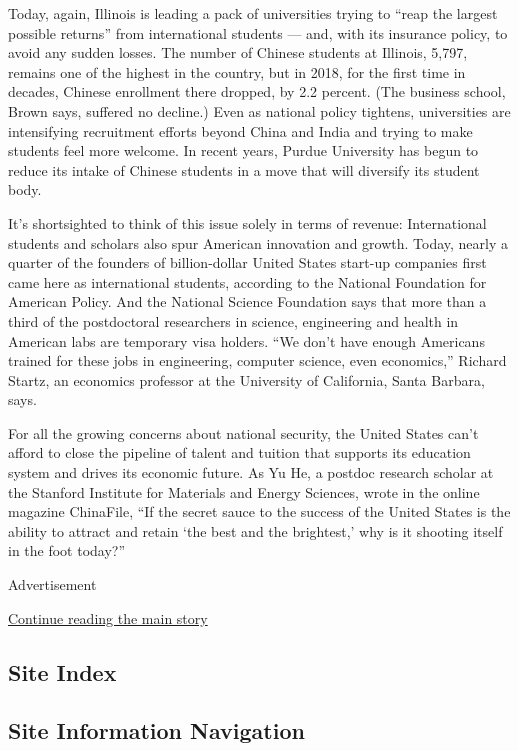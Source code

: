 Today, again, Illinois is leading a pack of universities trying to
``reap the largest possible returns'' from international students ---
and, with its insurance policy, to avoid any sudden losses. The number
of Chinese students at Illinois, 5,797, remains one of the highest in
the country, but in 2018, for the first time in decades, Chinese
enrollment there dropped, by 2.2 percent. (The business school, Brown
says, suffered no decline.) Even as national policy tightens,
universities are intensifying recruitment efforts beyond China and India
and trying to make students feel more welcome. In recent years, Purdue
University has begun to reduce its intake of Chinese students in a move
that will diversify its student body.

It's shortsighted to think of this issue solely in terms of revenue:
International students and scholars also spur American innovation and
growth. Today, nearly a quarter of the founders of billion-dollar United
States start-up companies first came here as international students,
according to the National Foundation for American Policy. And the
National Science Foundation says that more than a third of the
postdoctoral researchers in science, engineering and health in American
labs are temporary visa holders. ``We don't have enough Americans
trained for these jobs in engineering, computer science, even
economics,'' Richard Startz, an economics professor at the University of
California, Santa Barbara, says.

For all the growing concerns about national security, the United States
can't afford to close the pipeline of talent and tuition that supports
its education system and drives its economic future. As Yu He, a postdoc
research scholar at the Stanford Institute for Materials and Energy
Sciences, wrote in the online magazine ChinaFile, ``If the secret sauce
to the success of the United States is the ability to attract and retain
`the best and the brightest,' why is it shooting itself in the foot
today?''

Advertisement

\protect\hyperlink{after-bottom}{Continue reading the main story}

\hypertarget{site-index}{%
\subsection{Site Index}\label{site-index}}

\hypertarget{site-information-navigation}{%
\subsection{Site Information
Navigation}\label{site-information-navigation}}

